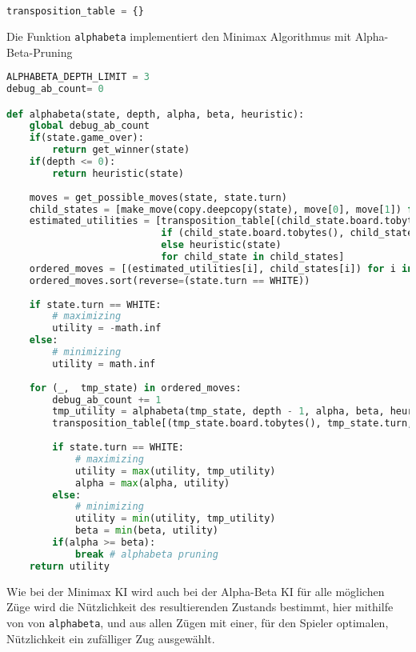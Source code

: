 \begin{lstlisting}[language=Python]
transposition_table = {}
\end{lstlisting}

Die Funktion \passthrough{\lstinline!alphabeta!} implementiert den
Minimax Algorithmus mit Alpha-Beta-Pruning

\begin{lstlisting}[language=Python]
ALPHABETA_DEPTH_LIMIT = 3
debug_ab_count= 0

def alphabeta(state, depth, alpha, beta, heuristic):
    global debug_ab_count
    if(state.game_over):
        return get_winner(state)
    if(depth <= 0):
        return heuristic(state)
    
    moves = get_possible_moves(state, state.turn)
    child_states = [make_move(copy.deepcopy(state), move[0], move[1]) for move in moves]
    estimated_utilities = [transposition_table[(child_state.board.tobytes(), child_state.turn, heuristic)]
                           if (child_state.board.tobytes(), child_state.turn, heuristic) in transposition_table
                           else heuristic(state)
                           for child_state in child_states]
    ordered_moves = [(estimated_utilities[i], child_states[i]) for i in range(len(moves))]
    ordered_moves.sort(reverse=(state.turn == WHITE))
    
    if state.turn == WHITE:
        # maximizing
        utility = -math.inf
    else:
        # minimizing
        utility = math.inf
        
    for (_,  tmp_state) in ordered_moves:
        debug_ab_count += 1
        tmp_utility = alphabeta(tmp_state, depth - 1, alpha, beta, heuristic)
        transposition_table[(tmp_state.board.tobytes(), tmp_state.turn, heuristic)] = tmp_utility
        
        if state.turn == WHITE:
            # maximizing
            utility = max(utility, tmp_utility)
            alpha = max(alpha, utility)
        else:
            # minimizing
            utility = min(utility, tmp_utility)
            beta = min(beta, utility)
        if(alpha >= beta):
            break # alphabeta pruning
    return utility
\end{lstlisting}

Wie bei der Minimax KI wird auch bei der Alpha-Beta KI für alle
möglichen Züge wird die Nützlichkeit des resultierenden Zustands
bestimmt, hier mithilfe von von \passthrough{\lstinline!alphabeta!}, und
aus allen Zügen mit einer, für den Spieler optimalen, Nützlichkeit ein
zufälliger Zug ausgewählt.

